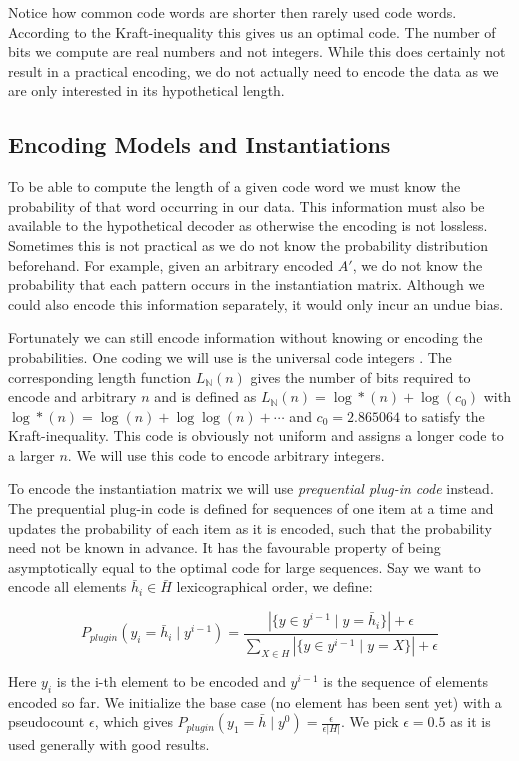 \documentclass{llncs}
\begin{document}
Notice how common code words are shorter then rarely used code words. According to the Kraft-inequality this gives us an optimal code. The number of bits we compute are real numbers and not integers. While this does certainly not result in a practical encoding, we do not actually need to encode the data as we are only interested in its hypothetical length.

\subsection{Encoding Models and Instantiations}
To be able to compute the length of a given code word we must know the probability of that word occurring in our data. This information must also be available to the hypothetical decoder as otherwise the encoding is not lossless. Sometimes this is not practical as we do not know the probability distribution beforehand. For example, given an arbitrary encoded $A'$, we do not know the probability that each pattern occurs in the instantiation matrix. Although we could also encode this information separately, it would only incur an undue bias.

Fortunately we can still encode information without knowing or encoding the probabilities. One coding we will use is the universal code integers \cite{integerprior}. The corresponding length function $L_{\mathbb{N}}(n)$ gives the number of bits required to encode and arbitrary $n$ and is defined as $L_{\mathbb{N}}(n) = \log*(n) + \log(c_0)$ with $\log*(n) = \log(n) + \log \log(n) + \cdots$ and $c_0=2.865064$ to satisfy the Kraft-inequality. This code is obviously not uniform and assigns a longer code to a larger $n$. We will use this code to encode arbitrary integers.

To encode the instantiation matrix we will use \emph{prequential plug-in code} \cite{ppcode} instead. The prequential plug-in code is defined for sequences of one item at a time and updates the probability of each item as it is encoded, such that the probability need not be known in advance. It has the favourable property of being asymptotically equal to the optimal code for large sequences. Say we want to encode all elements $\bar{h}_i \in \bar{H}$ lexicographical order, we define:
\begin{definition}\label{plugin}
$$
P_{plugin}( y_i = \bar{h}_i \mid y^{i-1} ) = \frac{|\{y \in y^{i-1} \mid y = \bar{h}_i\}| + \epsilon }{\sum_{X \in H}|\{y \in y^{i-1} \mid y = X\}| + \epsilon}
$$
\end{definition}
Here $y_i$ is the i-th element to be encoded and $y^{i-1}$ is the sequence of elements encoded so far. We initialize the base case (no element has been sent yet) with a pseudocount $\epsilon$, which gives $P_{plugin}( y_1 = \bar{h} \mid y^{0} ) = \frac{\epsilon}{\epsilon|H|}$. We pick $\epsilon=0.5$ as it is used generally with good results.
\end{document}
